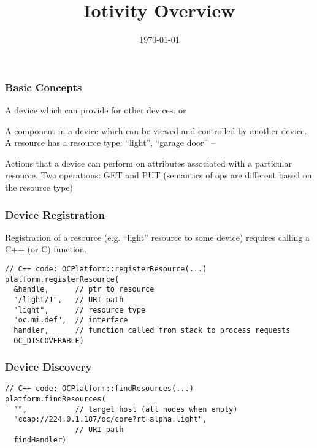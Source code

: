 \documentclass{beamer}
\title{Iotivity Overview}
\author{}
\date{\today}
\begin{document}
\begin{frame}
\titlepage
\end{frame}


\begin{frame}
\frametitle{Basic Concepts}

\bit
\w A device which can provide  for other devices.
\w {} or 
\eit

\vspace*{0.3cm}

\bit
\w A component in a device which can be viewed and controlled by another
device.
\w A resource has a resource type: ``light'', ``garage door'' --
\eit

\vspace*{0.3cm}

\bit
\w Actions that a device can perform on attributes associated with a
particular resource. 
\w Two operations: GET and PUT (semantics of ops are different based on the resource type)
\eit

\end{frame}

\begin{frame}[fragile]
\frametitle{Device Registration}

Registration of a resource (e.g. ``light'' resource to some device) requires
calling a C++ (or C) function.

{\scriptsize
\begin{verbatim}
// C++ code: OCPlatform::registerResource(...)
platform.registerResource(
  &handle,      // ptr to resource 
  "/light/1",   // URI path 
  "light",      // resource type
  "oc.mi.def",  // interface 
  handler,      // function called from stack to process requests
  OC_DISCOVERABLE) 
\end{verbatim}
}

\end{frame}



\begin{frame}[fragile]
\frametitle{Device Discovery}

{\scriptsize
\begin{verbatim}
// C++ code: OCPlatform::findResources(...)
platform.findResources(
  "",           // target host (all nodes when empty)
  "coap://224.0.1.187/oc/core?rt=alpha.light",
                // URI path
  findHandler)
\end{verbatim}
}

\end{frame}
\end{document}
